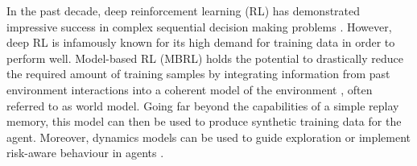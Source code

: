 \documentclass{article}
\begin{document}
In the past decade, deep reinforcement learning (RL) has demonstrated impressive success in complex sequential decision making problems \citep{mnih2013playing, lillicrap2019continuous, schulman2017proximal, haarnoja2018soft, silver2017mastering, vinyals2019grandmaster}.
However, deep RL is infamously known for its high demand for training data in order to perform well.
Model-based RL (MBRL) holds the potential to drastically reduce the required amount of training samples by integrating information from past environment interactions into a coherent model of the environment \citep{atkeson1997comparison, deisenroth2011pilco, chua2018deep, hafner2019learning}, often referred to as world model.
Going far beyond the capabilities of a simple replay memory, this model can then be used to produce synthetic training data for the agent.
Moreover, dynamics models can be used to guide exploration \citep{svidchenko2021maximum, kauvar2023curious} or implement risk-aware behaviour in agents \citep{yu2021riskaware}.
\end{document}
